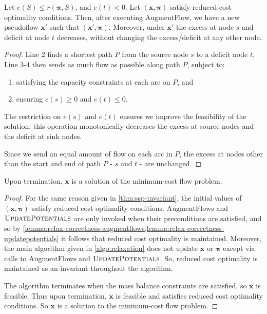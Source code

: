 \begin{lemma} \label{lemma:relax-correctness-augmentflow}
Let $e(S) \leq r(\boldsymbol{\pi},S)$, and $e(t) < 0$. Let $\left(\mathbf{x},\boldsymbol{\pi}\right)$ satisfy reduced cost optimality conditions. Then, after executing $\mathrm{AugmentFlow}$, we have a new pseudoflow $\mathbf{x}'$ such that $\left(\mathbf{x}',\boldsymbol{\pi}\right)$. Moreover, under $\mathbf{x}'$ the excess at node $s$ and deficit at node $t$ decreases, without changing the excess/deficit at any other node\footnotemark.
\end{lemma}
\begin{proof}
Line 2 finds a shortest path $P$ from the source node $s$ to a deficit node $t$. Line 3-4 then sends as much flow as possible along path $P$, subject to:
\begin{enumerate}
    \item satisfying the capacity constraints at each arc on $P$, and
    \item ensuring $e(s) \geq 0$ and $e(t) \leq 0$\footnotemark.
\end{enumerate}
The restriction on $e(s)$ and $e(t)$ ensures we improve the feasibility of the solution: this operation monotonically decreases the excess at source nodes and the deficit at sink nodes\footnotemark.

Since we send an equal amount of flow on each arc in $P$, the excess at nodes other than the start and end of path $P$ - $s$ and $t$ - are unchanged.
\end{proof}

\begin{thm}[Correctness] \label{thm:relax-correctness}
Upon termination, $\mathbf{x}$ is a solution of the minimum-cost flow problem.
\end{thm}
\begin{proof}
For the same reason given in \cref{thm:ssp-invariant}, the initial values of $\left(\mathbf{x},\boldsymbol{\pi}\right)$ satisfy reduced cost optimality conditions. $\mathrm{AugmentFlows}$ and $\textproc{UpdatePotentials}$ are only invoked when their preconditions are satisfied, and so by \cref{lemma:relax-correctness-augmentflows,lemma:relax-correctness-updatepotentials} it follows that reduced cost optimality is maintained. Moreover, the main algorithm given in \cref{algo:relaxation} does not update $\mathbf{x}$ or $\boldsymbol{\pi}$ except via calls to $\mathrm{AugmentFlows}$ and $\textproc{UpdatePotentials}$. So, reduced cost optimality is maintained as an invariant throughout the algorithm.

The algorithm terminates when the mass balance constraints are satisfied, so $\mathbf{x}$ is feasible. Thus upon termination, $\mathbf{x}$ is feasible and satisfies reduced cost optimality conditions. So $\mathbf{x}$ is a solution to the minimum-cost flow problem. 
\end{proof}

